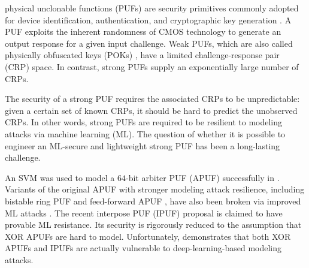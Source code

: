  physical unclonable functions (PUFs) are security primitives commonly adopted for device identification, authentication, and cryptographic key generation \cite{suh2007physical}.
A PUF exploits the inherent randomness of CMOS technology to generate an output response for a given input challenge. Weak PUFs, which are also called physically obfuscated keys (POKs) \cite{herder2017trapdoor}, have a limited challenge-response pair (CRP) space. In contrast, strong PUFs supply an exponentially large number of CRPs.

The security of a strong PUF requires the associated CRPs to be unpredictable: given a certain set of known CRPs, it should be hard to predict the unobserved CRPs. 
In other words, strong PUFs are required to be resilient to modeling attacks via machine learning (ML). 
The question of whether it is possible to engineer an ML-secure and lightweight strong PUF has been a long-lasting challenge. %

An SVM was used to model a $64$-bit arbiter PUF (APUF) successfully in \cite{lim2005extracting}.
Variants of the original APUF with stronger modeling attack resilience, including bistable ring PUF \cite{chen2011bistable} and feed-forward APUF \cite{lim2005extracting}, %
have also been broken via improved ML attacks %
\cite{ruhrmair2010modeling, schuster2014evaluation}.
The recent interpose PUF (IPUF) \cite{nguyen2019interpose} proposal is claimed to have provable ML resistance. Its security is rigorously reduced to the assumption that XOR APUFs are hard to model. Unfortunately, \cite{DBLP:journals/iacr/SantikellurBC19} demonstrates that both XOR APUFs and IPUFs are actually vulnerable to deep-learning-based modeling attacks.

